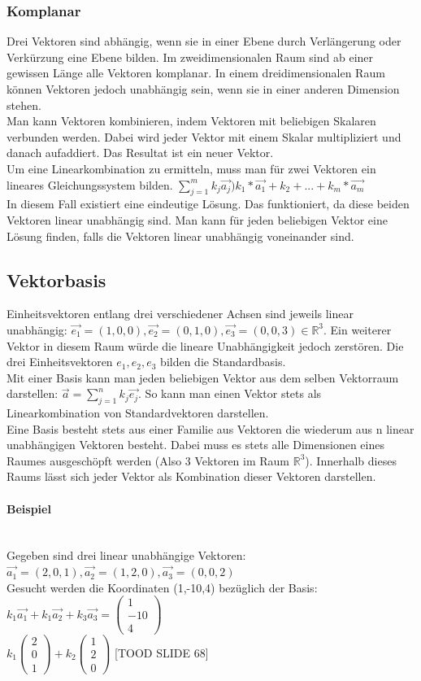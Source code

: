 \documentclass{article}
\newcommand{\paragraphlb}[1]{\paragraph{#1}\mbox{}\\}
\newcommand{\R}{\mathbb{R}}
\begin{document}
	\subsubsection{Komplanar}
	Drei Vektoren sind abhängig, wenn sie in einer Ebene durch Verlängerung oder Verkürzung eine Ebene bilden. Im zweidimensionalen Raum sind ab einer gewissen Länge alle Vektoren komplanar. In einem dreidimensionalen Raum können Vektoren jedoch unabhängig sein, wenn sie in einer anderen Dimension stehen. \\
	Man kann Vektoren kombinieren, indem Vektoren mit beliebigen Skalaren verbunden werden. Dabei wird jeder Vektor mit einem Skalar multipliziert und danach aufaddiert. Das Resultat ist ein neuer Vektor. \\
	Um eine Linearkombination zu ermitteln, muss man für zwei Vektoren ein lineares Gleichungssystem bilden. $\sum_{j=1}^{m}k_j \vec{a_j})k_1*\vec{a_1}+k_2+...+k_m*\vec{a_m}$ \\
	In diesem Fall existiert eine eindeutige Lösung. Das funktioniert, da diese beiden Vektoren linear unabhängig sind. Man kann für jeden beliebigen Vektor eine Lösung finden, falls die Vektoren linear unabhängig voneinander sind.
	\subsection{Vektorbasis}
	Einheitsvektoren entlang drei verschiedener Achsen sind jeweils linear unabhängig: $\vec{e_1}=(1,0,0),\vec{e_2}=(0,1,0),\vec{e_3}=(0,0,3)\in\R^3$. Ein weiterer Vektor in diesem Raum würde die lineare Unabhängigkeit jedoch zerstören. Die drei Einheitsvektoren $e_1,e_2,e_3$ bilden die Standardbasis. \\
	Mit einer Basis kann man jeden beliebigen Vektor aus dem selben Vektorraum darstellen: $\vec{a}=\sum_{j=1}^{n}k_j \vec{e_j}$. So kann man einen Vektor stets als Linearkombination von Standardvektoren darstellen. \\
	Eine Basis besteht stets aus einer Familie aus Vektoren die wiederum aus n linear unabhängigen Vektoren besteht. Dabei muss es stets alle Dimensionen eines Raumes ausgeschöpft werden (Also 3 Vektoren im Raum $\R^3$). Innerhalb dieses Raums lässt sich jeder Vektor als Kombination dieser Vektoren darstellen. \\
	\paragraphlb{Beispiel}
	Gegeben sind drei linear unabhängige Vektoren: $\vec{a_1}=(2,0,1),\vec{a_2}=(1,2,0),\vec{a_3}=(0,0,2)$ \\
	Gesucht werden die Koordinaten (1,-10,4) bezüglich der Basis: $k_1 \vec{a_1}+k_1 \vec{a_2}+k_3 \vec{a_3}=\begin{pmatrix} 1 \\ -10 \\ 4 \end{pmatrix}$ \\
	$k_1 \begin{pmatrix} 2 \\ 0 \\ 1 \end{pmatrix}+k_2 \begin{pmatrix} 1 \\ 2 \\ 0 \end{pmatrix}$ [TOOD SLIDE 68]
\end{document}
